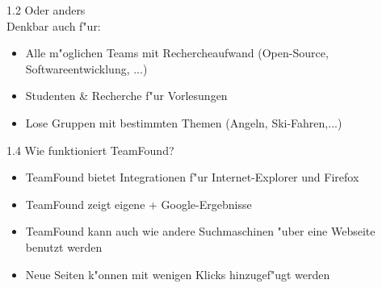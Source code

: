 \documentclass[landscape]{slides}
\begin{document}
%
\begin{slide}{1.2 Oder anders}\\

Denkbar auch f"ur:

\begin{itemize}
\item Alle m"oglichen Teams mit Rechercheaufwand (Open-Source, Softwareentwicklung, ...)
\item Studenten \& Recherche f"ur Vorlesungen
\item Lose Gruppen mit bestimmten Themen (Angeln, Ski-Fahren,...)
\end{itemize}
\end{slide}

\begin{slide}{1.4 Wie funktioniert TeamFound?}\\

\begin{itemize}
\item TeamFound bietet Integrationen f"ur Internet-Explorer und Firefox
\item TeamFound zeigt eigene + Google-Ergebnisse
\item TeamFound kann auch wie andere Suchmaschinen "uber eine Webseite benutzt werden
\item Neue Seiten k"onnen mit wenigen Klicks hinzugef"ugt werden
\end{itemize}
\end{slide}
\end{document}
